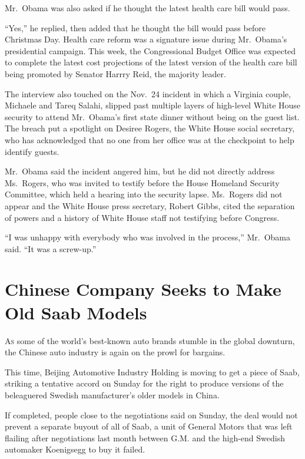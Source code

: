 ﻿\documentclass[12pt]{article}
\begin{document}
Mr.~Obama was also asked if he thought the latest health care bill would pass.

``Yes,'' he replied, then added that he thought the bill would pass before Christmas Day. Health
care reform was a signature issue during Mr.~Obama's presidential campaign. This week, the
Congressional Budget Office was expected to complete the latest cost projections of the latest
version of the health care bill being promoted by Senator Harrry Reid, the majority leader.

The interview also touched on the Nov.~24 incident in which a Virginia couple, Michaele and Tareq
Salahi, slipped past multiple layers of high-level White House security to attend Mr.~Obama's first
state dinner without being on the guest list. The breach put a spotlight on Desiree Rogers, the
White House social secretary, who has acknowledged that no one from her office was at the checkpoint
to help identify guests.

Mr.~Obama said the incident angered him, but he did not directly address Ms.~Rogers, who was invited
to testify before the House Homeland Security Committee, which held a hearing into the security
lapse. Ms.~Rogers did not appear and the White House press secretary, Robert Gibbs, cited the
separation of powers and a history of White House staff not testifying before Congress.

``I was unhappy with everybody who was involved in the process,'' Mr.~Obama said. ``It was a
screw-up.''

\section{Chinese Company Seeks to Make Old Saab Models}

\lettrine{A}{s} some of the world's best-known auto brands stumble in the
global downturn, the Chinese auto industry is again on the prowl\cite{prowl} for bargains.

This time, Beijing Automotive Industry Holding is moving to get a piece of Saab, striking a
tentative accord on Sunday for the right to produce versions of the beleaguered Swedish
manufacturer's older models in China.

If completed, people close to the negotiations said on Sunday, the deal would not prevent a separate
buyout of all of Saab, a unit of General Motors that was left flailing after negotiations last month
between G.M. and the high-end Swedish automaker Koenigsegg to buy it failed.
\end{document}
